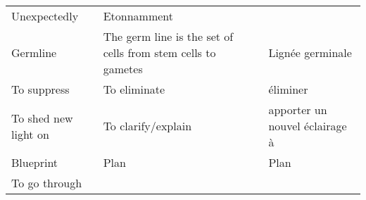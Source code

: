 \documentclass[]{article}
\begin{document}
\begin{longtable}[]{@{}lll@{}}
\begin{minipage}[t]{0.18\columnwidth}
Unexpectedly\strut
\end{minipage} & \begin{minipage}[t]{0.56\columnwidth}\raggedright
Etonnamment\strut
\end{minipage}\tabularnewline
\begin{minipage}[t]{0.18\columnwidth}\raggedright
Germline\strut
\end{minipage} & \begin{minipage}[t]{0.18\columnwidth}\raggedright
The germ line is the set of cells from stem cells to gametes\strut
\end{minipage} & \begin{minipage}[t]{0.56\columnwidth}\raggedright
Lignée germinale\strut
\end{minipage}\tabularnewline
\begin{minipage}[t]{0.18\columnwidth}\raggedright
To suppress\strut
\end{minipage} & \begin{minipage}[t]{0.18\columnwidth}\raggedright
To eliminate\strut
\end{minipage} & \begin{minipage}[t]{0.56\columnwidth}\raggedright
éliminer\strut
\end{minipage}\tabularnewline
\begin{minipage}[t]{0.18\columnwidth}\raggedright
To shed new light on\strut
\end{minipage} & \begin{minipage}[t]{0.18\columnwidth}\raggedright
To clarify/explain\strut
\end{minipage} & \begin{minipage}[t]{0.56\columnwidth}\raggedright
apporter un nouvel éclairage à\strut
\end{minipage}\tabularnewline
\begin{minipage}[t]{0.18\columnwidth}\raggedright
Blueprint\strut
\end{minipage} & \begin{minipage}[t]{0.18\columnwidth}\raggedright
Plan\strut
\end{minipage} & \begin{minipage}[t]{0.56\columnwidth}\raggedright
Plan\strut
\end{minipage}\tabularnewline
\begin{minipage}[t]{0.18\columnwidth}\raggedright
To go through\strut
\end{minipage} & \begin{minipage}[t]{0.18\columnwidth}\raggedright

\end{minipage}
\end{longtable}
\end{document}
